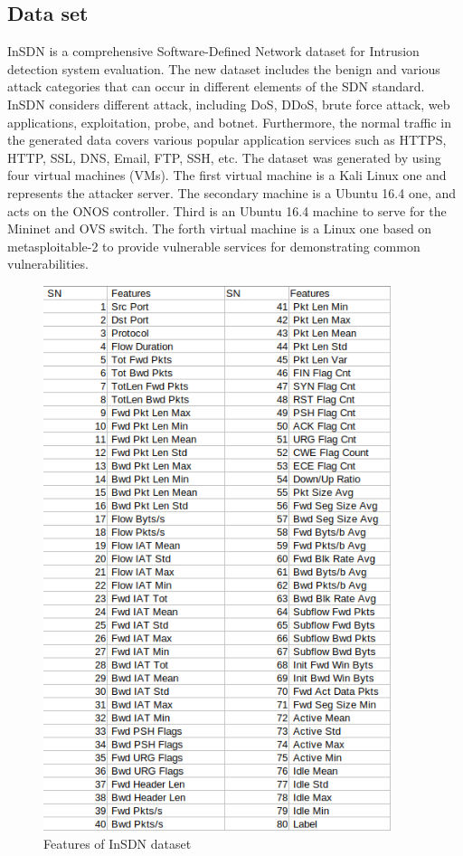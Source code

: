 \subsection{Data set}
\vspace{-18pt}
InSDN is a comprehensive Software-Defined Network dataset for Intrusion detection system evaluation. The new dataset includes the benign and various attack categories  that can occur in different elements of the SDN standard. InSDN considers different attack, including DoS, DDoS, brute force attack, web applications, exploitation, probe, and botnet. Furthermore, the normal traffic in the generated data covers  various  popular  application services such as HTTPS, HTTP, SSL, DNS, Email, FTP, SSH, etc. The dataset was generated by using four virtual machines (VMs). The first virtual machine is a Kali Linux one and represents the attacker server. The secondary machine is a Ubuntu 16.4 one, and acts on the ONOS controller. Third is an Ubuntu 16.4 machine to serve for the Mininet and OVS switch. The forth virtual machine is a Linux one based on metasploitable-2 to provide vulnerable services for demonstrating common vulnerabilities.\cite{article}
\begin{figure}[h] %
\begin{center}
	\includegraphics[width=4in]{images/ds2.png} 
	\caption{Features of InSDN dataset} %
	\label{} %
\end{center}
\end{figure}
